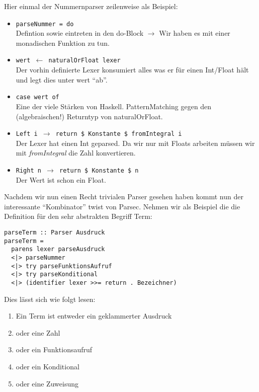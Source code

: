 \documentclass[12pt,german]{article}
\begin{document}
\noindent Hier einmal der  Nummernparser zeilenweise als Beispiel:
\begin{itemize}
\item \texttt{parseNummer = do}\\
Defintion sowie eintreten in den do-Block $\rightarrow$ Wir haben es mit einer
monadischen Funktion zu tun.
\item \texttt{wert $\leftarrow$ naturalOrFloat lexer}\\
Der vorhin definierte Lexer konsumiert alles was er für einen
Int/Float hält und legt dies unter wert ``ab''.
\item \texttt{case wert of}\\
Eine der viele Stärken von Haskell. PatternMatching gegen den
(algebraischen!) Returntyp von naturalOrFloat.
\item \texttt{Left i $\rightarrow$ return \$ Konstante \$ fromIntegral i}\\
Der Lexer hat einen Int geparsed. Da wir nur mit Floats arbeiten
müssen wir mit \textit{fromIntegral} die Zahl konvertieren.
\item \texttt{Right n $\rightarrow$ return \$ Konstante \$ n}\\
Der Wert ist schon ein Float.
\end{itemize}

Nachdem wir nun einen Recht trivialen Parser gesehen haben kommt nun
der interessante ``Kombinator'' twist von Parsec.
Nehmen wir als Beispiel die die Definition für den sehr abstrakten
Begriff Term:
\begin{lstlisting}[caption=Termparser]
parseTerm :: Parser Ausdruck
parseTerm =
  parens lexer parseAusdruck
  <|> parseNummer
  <|> try parseFunktionsAufruf
  <|> try parseKonditional
  <|> (identifier lexer >>= return . Bezeichner)
\end{lstlisting}

Dies lässt sich wie folgt lesen:
\begin{enumerate}
\item Ein Term ist entweder ein geklammerter Ausdruck
\item oder eine Zahl
\item oder ein Funktionsaufruf
\item oder ein Konditional
\item oder eine Zuweisung
\end{enumerate}
\end{document}
